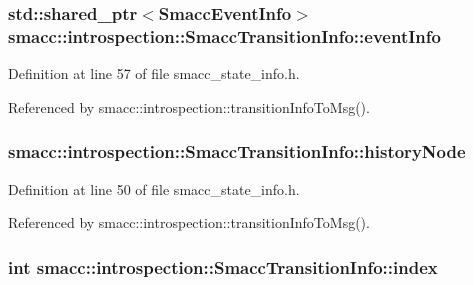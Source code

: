\subsubsection[{\texorpdfstring{event\+Info}{eventInfo}}]{\setlength{\rightskip}{0pt plus 5cm}std\+::shared\+\_\+ptr$<${\bf Smacc\+Event\+Info}$>$ smacc\+::introspection\+::\+Smacc\+Transition\+Info\+::event\+Info}\hypertarget{structsmacc_1_1introspection_1_1SmaccTransitionInfo_a573be95bb6fdeeae46fc5ed56b260138}{}\label{structsmacc_1_1introspection_1_1SmaccTransitionInfo_a573be95bb6fdeeae46fc5ed56b260138}


Definition at line 57 of file smacc\+\_\+state\+\_\+info.\+h.



Referenced by smacc\+::introspection\+::transition\+Info\+To\+Msg().

\subsubsection[{\texorpdfstring{history\+Node}{historyNode}}]{ smacc\+::introspection\+::\+Smacc\+Transition\+Info\+::history\+Node}\hypertarget{structsmacc_1_1introspection_1_1SmaccTransitionInfo_acbb8f7891dd0c541b26feb82149cb780}{}\label{structsmacc_1_1introspection_1_1SmaccTransitionInfo_acbb8f7891dd0c541b26feb82149cb780}


Definition at line 50 of file smacc\+\_\+state\+\_\+info.\+h.



Referenced by smacc\+::introspection\+::transition\+Info\+To\+Msg().

\subsubsection[{\texorpdfstring{index}{index}}]{\setlength{\rightskip}{0pt plus 5cm}int smacc\+::introspection\+::\+Smacc\+Transition\+Info\+::index}\hypertarget{structsmacc_1_1introspection_1_1SmaccTransitionInfo_a4b9e9f140aefd8ecd6697bcaa4b681af}{}\label{structsmacc_1_1introspection_1_1SmaccTransitionInfo_a4b9e9f140aefd8ecd6697bcaa4b681af}


